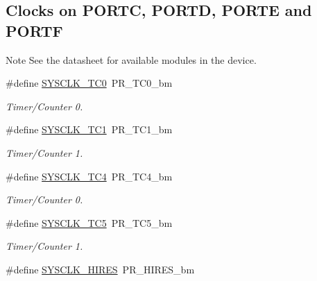 \subsection*{Clocks on P\-O\-R\-T\-C, P\-O\-R\-T\-D, P\-O\-R\-T\-E and P\-O\-R\-T\-F}
\label{_amgrp7d6eb06061f900c08ee04b134c9a102f}%
 \begin{DoxyNote}{Note}
See the datasheet for available modules in the device. 
\end{DoxyNote}
\begin{DoxyCompactItemize}
\item 
\hypertarget{group__sysclk__group_gabe7aa477c7c5b3887df1d762a750b04a}{\#define \hyperlink{group__sysclk__group_gabe7aa477c7c5b3887df1d762a750b04a}{S\-Y\-S\-C\-L\-K\-\_\-\-T\-C0}~P\-R\-\_\-\-T\-C0\-\_\-bm}\label{group__sysclk__group_gabe7aa477c7c5b3887df1d762a750b04a}

\begin{DoxyCompactList}\small\item\em Timer/\-Counter 0. \end{DoxyCompactList}\item 
\hypertarget{group__sysclk__group_ga03be785696a3e76b1b3c6ea6104ac630}{\#define \hyperlink{group__sysclk__group_ga03be785696a3e76b1b3c6ea6104ac630}{S\-Y\-S\-C\-L\-K\-\_\-\-T\-C1}~P\-R\-\_\-\-T\-C1\-\_\-bm}\label{group__sysclk__group_ga03be785696a3e76b1b3c6ea6104ac630}

\begin{DoxyCompactList}\small\item\em Timer/\-Counter 1. \end{DoxyCompactList}\item 
\hypertarget{group__sysclk__group_ga1f0701f896e28b3d2779e826b2455d39}{\#define \hyperlink{group__sysclk__group_ga1f0701f896e28b3d2779e826b2455d39}{S\-Y\-S\-C\-L\-K\-\_\-\-T\-C4}~P\-R\-\_\-\-T\-C4\-\_\-bm}\label{group__sysclk__group_ga1f0701f896e28b3d2779e826b2455d39}

\begin{DoxyCompactList}\small\item\em Timer/\-Counter 0. \end{DoxyCompactList}\item 
\hypertarget{group__sysclk__group_ga923ca542e7cfde98fd5c504ab79cbc42}{\#define \hyperlink{group__sysclk__group_ga923ca542e7cfde98fd5c504ab79cbc42}{S\-Y\-S\-C\-L\-K\-\_\-\-T\-C5}~P\-R\-\_\-\-T\-C5\-\_\-bm}\label{group__sysclk__group_ga923ca542e7cfde98fd5c504ab79cbc42}

\begin{DoxyCompactList}\small\item\em Timer/\-Counter 1. \end{DoxyCompactList}\item 
\hypertarget{group__sysclk__group_ga60f56ce5bec478e5ea847e48f64ea3b3}{\#define \hyperlink{group__sysclk__group_ga60f56ce5bec478e5ea847e48f64ea3b3}{S\-Y\-S\-C\-L\-K\-\_\-\-H\-I\-R\-E\-S}~P\-R\-\_\-\-H\-I\-R\-E\-S\-\_\-bm}\label{group__sysclk__group_ga60f56ce5bec478e5ea847e48f64ea3b3}


\end{DoxyCompactItemize}

